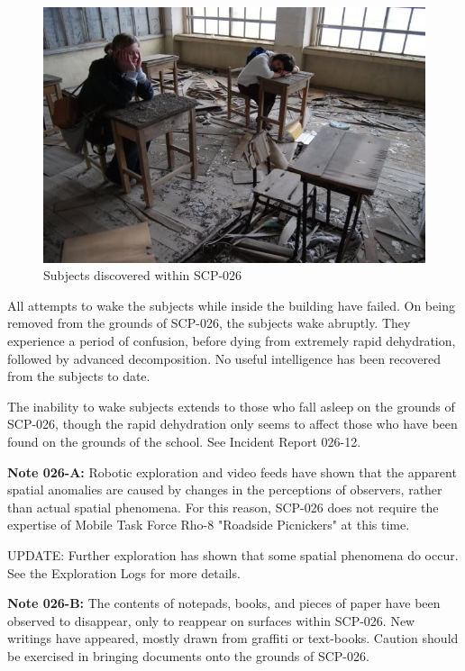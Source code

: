 \begin{figure}[h]
\begin{center}
\includegraphics[scale=0.4]{scp/026c.jpg}
\linebreak Subjects discovered within SCP-026
\end{center}
\end{figure}

All attempts to wake the subjects while inside the building have failed. On being removed from the grounds of SCP-026, the subjects wake abruptly. They experience a period of confusion, before dying from extremely rapid dehydration, followed by advanced decomposition. No useful intelligence has been recovered from the subjects to date.

The inability to wake subjects extends to those who fall asleep on the grounds of SCP-026, though the rapid dehydration only seems to affect those who have been found on the grounds of the school. See Incident Report 026-12.

\textbf{Note 026-A:} Robotic exploration and video feeds have shown that the apparent spatial anomalies are caused by changes in the perceptions of observers, rather than actual spatial phenomena. For this reason, SCP-026 does not require the expertise of Mobile Task Force Rho-8 "Roadside Picnickers" at this time.

UPDATE: Further exploration has shown that some spatial phenomena do occur. See the Exploration Logs for more details.

\textbf{Note 026-B:} The contents of notepads, books, and pieces of paper have been observed to disappear, only to reappear on surfaces within SCP-026. New writings have appeared, mostly drawn from graffiti or text-books. Caution should be exercised in bringing documents onto the grounds of SCP-026.

